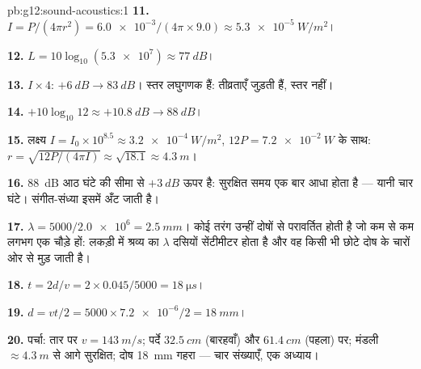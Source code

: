 \begin{solution}{pb:g12:sound-acoustics:1}
\textbf{11.} $I = P/(4\pi r^2) = \num{6.0e-3}/(4\pi \times 9.0)
\approx \qty{5.3e-5}{W/m^2}$।

\textbf{12.} $L = 10\log_{10}(\num{5.3e7}) \approx \qty{77}{dB}$।

\textbf{13.} $I \times 4$: $+\qty{6}{dB} \to \qty{83}{dB}$। स्तर लघुगणक हैं: तीव्रताएँ जुड़ती हैं, स्तर
नहीं।

\textbf{14.} $+10\log_{10}12 \approx +\qty{10.8}{dB} \to
\qty{88}{dB}$।

\textbf{15.} लक्ष्य $I = I_0 \times 10^{8.5} \approx
\qty{3.2e-4}{W/m^2}$, $12P = \qty{7.2e-2}{W}$ के साथ: $r = \sqrt{12P/(4\pi I)} \approx \sqrt{18.1} \approx \qty{4.3}{m}$।

\textbf{16.} \qty{88}{dB} आठ घंटे की सीमा से $+\qty{3}{dB}$ ऊपर है: सुरक्षित समय एक बार
आधा होता है --- यानी चार घंटे। संगीत-संध्या इसमें अँट जाती है।

\textbf{17.} $\lambda = 5000/\num{2.0e6} = \qty{2.5}{mm}$। कोई तरंग उन्हीं दोषों से परावर्तित होती है जो
कम से कम लगभग एक  चौड़े हों: लकड़ी में श्रव्य
 का $\lambda$ दसियों सेंटीमीटर होता है और वह किसी भी छोटे दोष के
चारों ओर से मुड़ जाती है।

\textbf{18.} $t = 2d/v = 2 \times 0.045/5000 = \qty{18}{\micro s}$।

\textbf{19.} $d = vt/2 = 5000 \times \num{7.2e-6}/2 = \qty{18}{mm}$।

\textbf{20.} पर्चा: तार पर $v = \qty{143}{m/s}$; पर्दे $\qty{32.5}{cm}$ (बारहवाँ) और $\qty{61.4}{cm}$
(पहला) पर; मंडली $\approx \qty{4.3}{m}$ से आगे सुरक्षित; दोष \qty{18}{mm} गहरा --- चार संख्याएँ,
एक अध्याय।
\end{solution}
